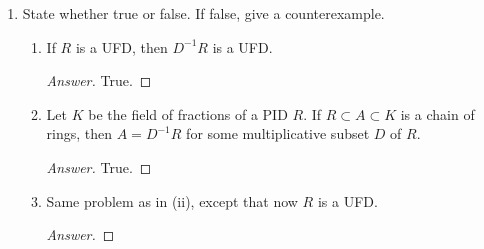 \documentclass[../psets.tex]{subfiles}
\begin{document}
\begin{enumerate}
\begin{proof}
        Since $f(c)=0$, it follows that
        \begin{equation*}
            f(X) = q(X)\cdot(X-c)
        \end{equation*}
        for some $q\in K[X]$. Note that since $f$ is monic, $q$ must have leading coefficient 1. The main takeaway from the above equation is that $f$ is reducible in $K[X]$. Thus, since $R$ is a UFD, $\Frac R=K$, $f\in R[X]$, and $f$ is reducible in $K[X]$, Gauss' Lemma asserts that there exist $r,s\in K$ such that $rq,s(X-c)\in R[X]$ and
        \begin{equation*}
            f(X) = rq(X)\cdot s(X-c)
        \end{equation*}
        is a factorization of $f$ in $R[X]$. But since $q,(X-c)$ have leading coefficient 1 and $f$ is monic, we must have $rs=1$. Therefore,
        \begin{equation*}
            f(X) = q(X)\cdot(X-c)
        \end{equation*}
        is a factorization in $R[X]$. In particular, $X-c\in R[X]$, meaning that $c\in R$, as desired.
    \end{proof}
    \item State whether true or false. If false, give a counterexample.
    \begin{enumerate}
        \item If $R$ is a UFD, then $D^{-1}R$ is a UFD.
        \begin{proof}[Answer]
            True.
        \end{proof}
        \item Let $K$ be the field of fractions of a PID $R$. If $R\subset A\subset K$ is a chain of rings, then $A=D^{-1}R$ for some multiplicative subset $D$ of $R$.
        \begin{proof}[Answer]
            True.
        \end{proof}
        \item Same problem as in (ii), except that now $R$ is a UFD.
        \begin{proof}[Answer]
            

\end{proof}
\end{enumerate}
\end{enumerate}
\end{document}
